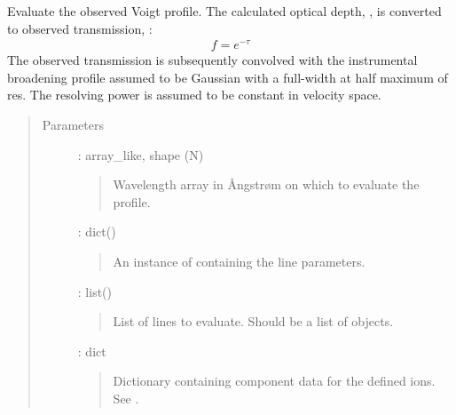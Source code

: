 \documentclass[letterpaper,10pt,english]{sphinxmanual}
\begin{document}
\begin{fulllineitems}
\label{\detokenize{api:voigt.evaluate_profile}}
Evaluate the observed Voigt profile. The calculated optical depth, ,
is converted to observed transmission, :
\begin{equation*}
\begin{split}f = e^{-\tau}\end{split}
\end{equation*}
The observed transmission is subsequently convolved with the instrumental
broadening profile assumed to be Gaussian with a full-width at half maximum
of res. The resolving power is assumed to be constant in velocity space.
\begin{quote}\begin{description}
\item[{Parameters}] \leavevmode
{} : array\_like, shape (N)
\begin{quote}

Wavelength array in Ångstrøm on which to evaluate the profile.
\end{quote}

 : dict()
\begin{quote}

An instance of  containing the line parameters.
\end{quote}

 : list({\hyperref[\detokenize{api:dataset.Line}]{}})
\begin{quote}

List of lines to evaluate. Should be a list of
{\hyperref[\detokenize{api:dataset.Line}]{}} objects.
\end{quote}

 : dict
\begin{quote}

Dictionary containing component data for the defined ions.
See .
\end{quote}


\end{description}
\end{quote}
\end{fulllineitems}
\end{document}
